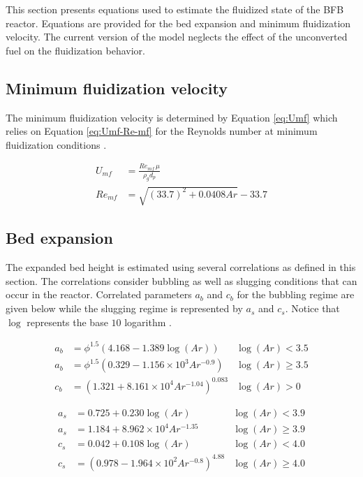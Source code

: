 \documentclass[12pt]{article}
\begin{document}
This section presents equations used to estimate the fluidized state of the BFB reactor. Equations are provided for the bed expansion and minimum fluidization velocity. The current version of the model neglects the effect of the unconverted fuel on the fluidization behavior.

\subsection{Minimum fluidization velocity}

The minimum fluidization velocity is determined by Equation \ref{eq:Umf} which relies on Equation \ref{eq:Umf-Re-mf} for the Reynolds number at minimum fluidization conditions \cite{Wen-1966}.

\begin{align}
    U_{mf} &= \frac{Re_{mf}\,\mu}{\rho_g d_p} \label{eq:Umf} \\
    Re_{mf} &= \sqrt{(33.7)^2 + 0.0408 Ar} - 33.7 \label{eq:Umf-Re-mf}
\end{align}

\subsection{Bed expansion}

The expanded bed height is estimated using several correlations as defined in this section. The correlations consider bubbling as well as slugging conditions that can occur in the reactor. Correlated parameters $a_b$ and $c_b$ for the bubbling regime are given below while the slugging regime is represented by $a_s$ and $c_s$. Notice that $\log$ represents the base $10$ logarithm \cite{Agu-2018}.

\begin{align}
    a_b &= \phi^{1.5} (4.168 - 1.389 \log(Ar))            & \log(Ar) < 3.5 \\
    a_b &= \phi^{1.5} (0.329 - 1.156\times10^3 Ar^{-0.9}) & \log(Ar) \geq 3.5\\
    c_b &= (1.321 + 8.161\times10^4 Ar^{-1.04})^{0.083}   & \log(Ar) > 0
\end{align}

\begin{align}
    a_s &= 0.725 + 0.230 \log(Ar)                     & \log(Ar) < 3.9 \\
    a_s &= 1.184 + 8.962\times10^4 Ar^{-1.35}         & \log(Ar) \geq 3.9 \\
    c_s &= 0.042 + 0.108 \log(Ar)                     & \log(Ar) < 4.0 \\
    c_s &= (0.978 - 1.964\times10^2 Ar^{-0.8})^{4.88} & \log(Ar) \geq 4.0
\end{align}
\end{document}
